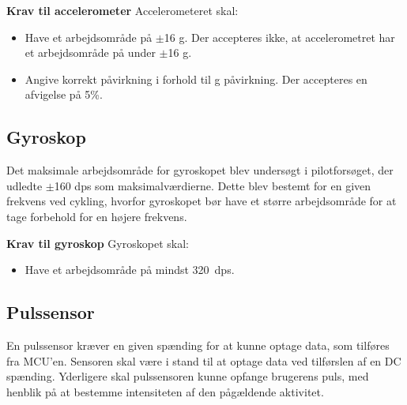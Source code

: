 \textbf{Krav til accelerometer} \newline 
Accelerometeret skal:
\begin{itemize}
\item Have et arbejdsområde på $\pm$16 g. Der accepteres ikke, at accelerometret har et arbejdsområde på under $\pm$16 g.
\item Angive korrekt påvirkning i forhold til g påvirkning. Der accepteres en afvigelse på 5\%.
\end{itemize}

\subsection{Gyroskop} 
Det maksimale arbejdsområde for gyroskopet blev undersøgt i pilotforsøget, der udledte $\pm$160 dps som maksimalværdierne. Dette blev bestemt for en given frekvens ved cykling, hvorfor gyroskopet bør have et større arbejdsområde for at tage forbehold for en højere frekvens. %

\textbf{Krav til gyroskop} \newline
Gyroskopet skal:
\begin{itemize}
\item Have et arbejdsområde på mindst 320~dps.
\end{itemize}

\subsection{Pulssensor}
En pulssensor kræver en given spænding for at kunne optage data, som tilføres fra MCU'en. Sensoren skal være i stand til at optage data ved tilførslen af en DC spænding. %
Yderligere skal pulssensoren kunne opfange brugerens puls, med henblik på at bestemme intensiteten af den pågældende aktivitet.

